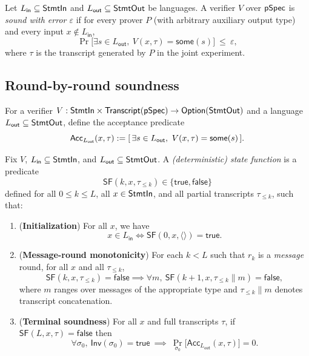 \begin{definition}[Soundness]
Let $L_{\mathsf{in}} \subseteq \mathsf{StmtIn}$ and $L_{\mathsf{out}} \subseteq \mathsf{StmtOut}$ be languages. A
verifier $V$ over $\mathsf{pSpec}$ is \emph{sound with error $\varepsilon$} if for every prover $P$ (with
arbitrary auxiliary output type) and every input $x \notin L_{\mathsf{in}}$,
\[
  \Pr\bigl[\exists s \in L_{\mathsf{out}},\ V(x,\tau) = \mathsf{some}(s)\bigr] \ \le\ \varepsilon,
\]
where $\tau$ is the transcript generated by $P$ in the joint experiment.
\end{definition}

\subsection{Round-by-round soundness}

\begin{definition}
\label{def:acc_option}
For a verifier $V : \mathsf{StmtIn} \times \mathsf{Transcript}(\mathsf{pSpec}) \to \mathsf{Option}(\mathsf{StmtOut})$ and a language
$L_{\mathsf{out}} \subseteq \mathsf{StmtOut}$, define the acceptance predicate
\[
  \mathsf{Acc}_{L_{\mathsf{out}}}(x,\tau) \mathrel{:=}
  [\,\exists s \in L_{\mathsf{out}},\ V(x,\tau) = \mathsf{some}(s)\,].
\]
\end{definition}

\begin{definition}
Fix $V$, $L_{\mathsf{in}} \subseteq \mathsf{StmtIn}$, and $L_{\mathsf{out}} \subseteq \mathsf{StmtOut}$. A
\emph{(deterministic) state function} is a predicate
\[
  \mathsf{SF}(k,x,\tau_{\le k}) \in \{\mathsf{true},\mathsf{false}\}
\]
defined for all $0 \le k \le L$, all $x \in \mathsf{StmtIn}$, and all partial transcripts $\tau_{\le k}$,
such that:
\begin{enumerate}
  \item (\textbf{Initialization}) For all $x$, we have
  \[
    x \in L_{\mathsf{in}} \iff \mathsf{SF}(0,x,\langle\rangle)=\mathsf{true}.
  \]
  \item (\textbf{Message-round monotonicity}) For each $k < L$ such that $r_k$ is a \emph{message}
  round, for all $x$ and all $\tau_{\le k}$,
  \[
    \mathsf{SF}(k,x,\tau_{\le k})=\mathsf{false}
    \implies
    \forall m,\ \mathsf{SF}(k+1,x,\tau_{\le k}\mathbin{\|}m)=\mathsf{false},
  \]
  where $m$ ranges over messages of the appropriate type and $\tau_{\le k}\mathbin{\|}m$ denotes
  transcript concatenation.
  \item (\textbf{Terminal soundness}) For all $x$ and full transcripts $\tau$, if
  $\mathsf{SF}(L,x,\tau)=\mathsf{false}$ then
  \[
    \forall \sigma_0,\ \mathsf{Inv}(\sigma_0)=\mathsf{true}\ \implies\
      \Pr_{\sigma_0}\bigl[\mathsf{Acc}_{L_{\mathsf{out}}}(x,\tau)\bigr]=0.
  \]
\end{enumerate}
\end{definition}

